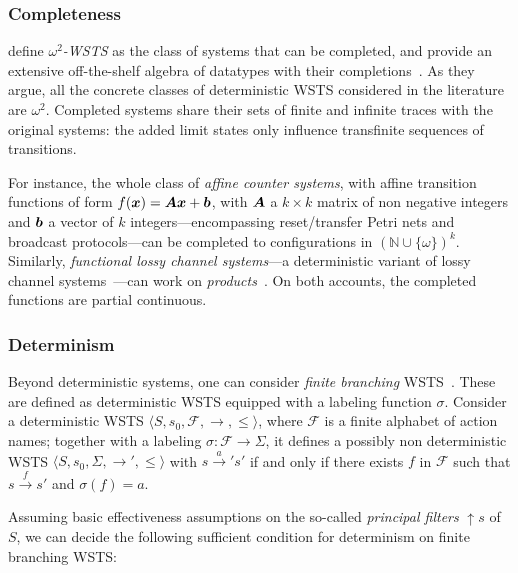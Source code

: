 \documentclass[11pt,reqno,a4paper]{amsart}
\def\vec#1{\mathchoice{\mbox{\boldmath$\displaystyle#1$}}
{\mbox{\boldmath$\textstyle#1$}}
{\mbox{\boldmath$\scriptstyle#1$}}
{\mbox{\boldmath$\scriptscriptstyle#1$}}}
\newcommand{\tup}[1]{\langle #1\rangle}
\newcommand{\uc}{\mathop{\uparrow}\!}
\newcommand{\ru}[1]{\xrightarrow{#1}}
\theoremstyle{plain}
\theoremstyle{definition}
\theoremstyle{remark}
\renewcommand{\paragraph}{\subsubsection*}
\begin{document}
\paragraph{Completeness}
\citet{cwsts2} define \emph{$\omega^2$-WSTS} as the class
of systems that can be completed, and provide an extensive off-the-shelf
algebra of datatypes with their completions~\citep{cwsts1}.  As they
argue, all the concrete classes of deterministic WSTS considered in
the literature are $\omega^2$.  Completed systems share their sets of
finite and infinite traces with the original systems: the added limit
states only influence transfinite sequences of transitions.

For instance, the whole class of \emph{affine counter systems}, with
affine transition functions of form $f(\vec x)=\vec A\vec x+\vec b$,
with $\vec A$ a $k\times k$ matrix of non negative integers and $\vec
b$ a vector of $k$ integers---encompassing reset/transfer Petri nets
and broadcast protocols---can be completed to configurations in
$(\mathbb{N}\cup\{\omega\})^k$.  Similarly, \emph{functional lossy
  channel systems}---a deterministic variant of lossy channel
systems~\citep[see also \autoref{sub:posta}]{cwsts1}---can work on
\emph{products}~\citep[Corollary~6.5]{fwlcs}.  On both accounts, the
completed functions are partial continuous.

\paragraph{Determinism}
Beyond deterministic systems, one can consider \emph{finite branching}
WSTS~\citep{cwsts1}.  These are defined as deterministic WSTS equipped
with a labeling function $\sigma$.  Consider a deterministic WSTS
$\tup{S,s_0,\mathcal{F},{\rightarrow},{\leq}}$, where $\mathcal{F}$ is
a finite alphabet of action names; together with a labeling $\sigma:
\mathcal{F}\rightarrow\Sigma$, it defines a possibly non deterministic
WSTS $\tup{S,s_0,\Sigma,{\rightarrow}',{\leq}}$ with $s\ru{a}'s'$ if
and only if there exists $f$ in $\mathcal{F}$ such that $s\ru{f}s'$
and $\sigma(f)=a$.

Assuming basic effectiveness assumptions on the so-called
\emph{principal filters} $\uc s$ of $S$, we can decide the following
sufficient condition for determinism on finite branching WSTS:
\end{document}
